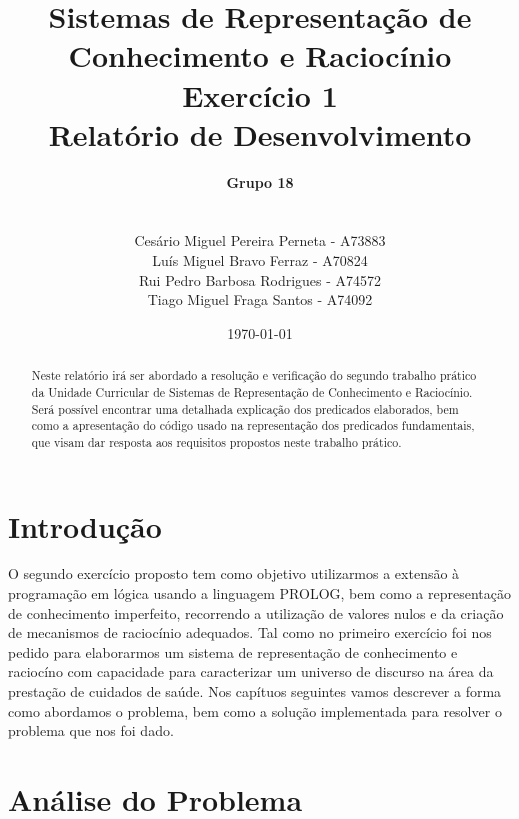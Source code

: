 \documentclass{report}
\title{Sistemas de Representação de Conhecimento e Raciocínio\\ \textbf{Exercício 1}\\ Relatório de Desenvolvimento}
\author{\textbf{Grupo 18}\\
\\
\\
Cesário Miguel Pereira Perneta - A73883
\\
Luís Miguel Bravo Ferraz - A70824
\\
Rui Pedro Barbosa Rodrigues - A74572
\\
Tiago Miguel Fraga Santos - A74092}
\date{\today}
\begin{document}
 
 
\maketitle
 
\begin{abstract}
Neste relatório irá ser abordado a resolução e verificação do segundo trabalho prático da Unidade Curricular de Sistemas de Representação de Conhecimento e Raciocínio.
Será possível encontrar uma detalhada explicação dos predicados elaborados, bem como a apresentação do código usado na representação dos predicados fundamentais, que visam dar resposta aos requisitos propostos neste trabalho prático.
\end{abstract}
 
\tableofcontents

\chapter{Introdução} \label{intro}

O segundo exercício proposto tem como objetivo utilizarmos a extensão à programação em lógica usando a linguagem PROLOG, bem como a representação de conhecimento imperfeito, recorrendo a utilização de valores nulos e da criação de mecanismos de raciocínio adequados. Tal como no primeiro exercício foi nos pedido para elaborarmos um sistema de representação de conhecimento e raciocíno com capacidade para caracterizar um universo de discurso na área da prestação de cuidados de saúde. Nos capítuos seguintes vamos descrever a forma como abordamos o problema, bem como a solução implementada para resolver o problema que nos foi dado.

\chapter{Análise do Problema}
\end{document}
